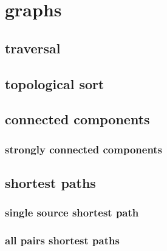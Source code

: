 \section{graphs}
\subsection{traversal}




\subsection{topological sort}




\subsection{connected components}

\subsubsection{strongly connected components}



\subsection{shortest paths}

\subsubsection{single source shortest path}



\subsubsection{all pairs shortest paths}




